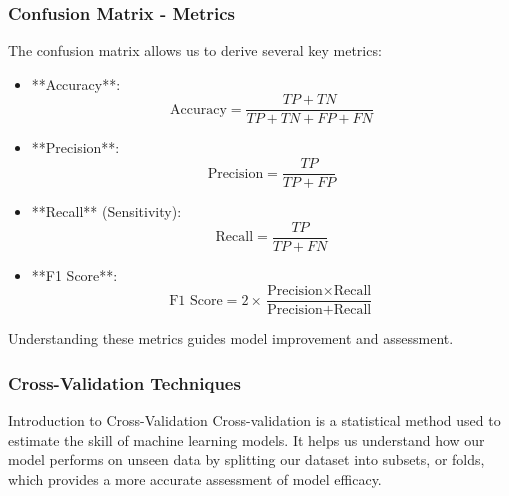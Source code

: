 \documentclass[aspectratio=169]{beamer}
\begin{document}
\begin{frame}[fragile]
    \frametitle{Confusion Matrix - Metrics}
    
    The confusion matrix allows us to derive several key metrics:
    
    \begin{itemize}
        \item **Accuracy**:
        \begin{equation}
            \text{Accuracy} = \frac{TP + TN}{TP + TN + FP + FN}
        \end{equation}
        
        \item **Precision**:
        \begin{equation}
            \text{Precision} = \frac{TP}{TP + FP}
        \end{equation}
        
        \item **Recall** (Sensitivity):
        \begin{equation}
            \text{Recall} = \frac{TP}{TP + FN}
        \end{equation}
        
        \item **F1 Score**:
        \begin{equation}
            \text{F1 Score} = 2 \times \frac{\text{Precision} \times \text{Recall}}{\text{Precision} + \text{Recall}}
        \end{equation}
    \end{itemize}
    
    Understanding these metrics guides model improvement and assessment.
\end{frame}

\begin{frame}[fragile]
    \frametitle{Cross-Validation Techniques}
    \begin{block}{Introduction to Cross-Validation}
        Cross-validation is a statistical method used to estimate the skill of machine learning models. It helps us understand how our model performs on unseen data by splitting our dataset into subsets, or folds, which provides a more accurate assessment of model efficacy.
    \end{block}
\end{frame}
\end{document}
